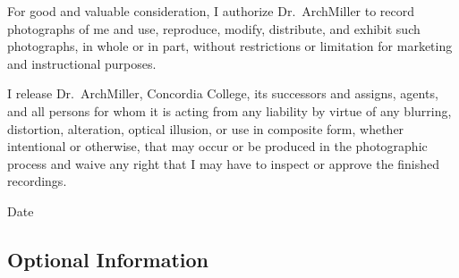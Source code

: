 \documentclass{tufte-handout}
\begin{document}
For good and valuable consideration, I authorize Dr.~ArchMiller to record photographs of me and use, reproduce, modify, distribute, and exhibit such photographs, in whole or in part, without restrictions or limitation for marketing and instructional purposes. 

I release Dr.~ArchMiller, Concordia College, its successors and assigns, agents, and all persons for whom it is acting from any liability by virtue of any blurring, distortion, alteration, optical illusion, or use in composite form, whether intentional or otherwise, that may occur or be produced in the photographic process and waive any right that I may have to inspect or approve the finished recordings.

  \hrulefill
{}  \underline{\hspace{5cm}} {Date}  \hrulefill

\subsection{Optional Information}

 \hrulefill

 \hrulefill

 \hrulefill

 \hrulefill


 \hrulefill

\hrulefill

\hrulefill

\hrulefill

\hrulefill

\hrulefill
\end{document}
